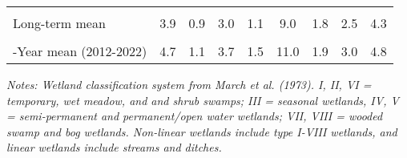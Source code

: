 \documentclass[
  12pt,
]{article}
\begin{document}
\begin{table}[!h]
{\begin{threeparttable}
\begin{tabular}[t]{>{\centering\arraybackslash}m{8em}cccccccc}
\cellcolor{gray!6}{\% Change from previous year} & \cellcolor{gray!6}{222.0\%} & \cellcolor{gray!6}{147.5\%} & \cellcolor{gray!6}{2.8\%} & \cellcolor{gray!6}{72.8\%} & \cellcolor{gray!6}{87.1\%} & \cellcolor{gray!6}{1.4\%} & \cellcolor{gray!6}{48.8\%} & \cellcolor{gray!6}{25.8\%}\\
Long-term mean & 3.9 & 0.9 & 3.0 & 1.1 & 9.0 & 1.8 & 2.5 & 4.3\\
\cellcolor{gray!6}{\% Change from long-term mean} & \cellcolor{gray!6}{140.5\%} & \cellcolor{gray!6}{143.9\%} & \cellcolor{gray!6}{71.0\%} & \cellcolor{gray!6}{173.1\%} & \cellcolor{gray!6}{121.6\%} & \cellcolor{gray!6}{51.9\%} & \cellcolor{gray!6}{66.7\%} & \cellcolor{gray!6}{60.5\%}\\
10-Year mean (2012-2022) & 4.7 & 1.1 & 3.7 & 1.5 & 11.0 & 1.9 & 3.0 & 4.8\\
\bottomrule
\end{tabular}
\begin{tablenotes}
\small
\item \textit{Notes: Wetland classification system from March et al. (1973). 
      I, II, VI = temporary, wet meadow, and and shrub swamps; III = seasonal wetlands, IV, V = semi-permanent 
      and permanent/open water wetlands; VII, VIII = wooded swamp and bog wetlands. Non-linear wetlands include
      type I-VIII wetlands, and linear wetlands include streams and ditches.} 
\item 
\end{tablenotes}
\end{threeparttable}}
\end{table}

\newpage
\end{document}
